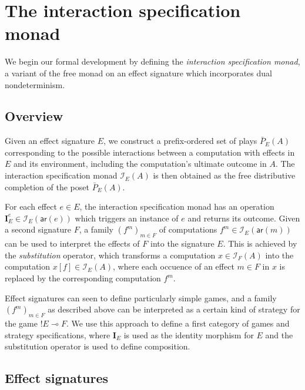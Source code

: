 \documentclass[format=sigplan,authordraft]{acmart}
\newcommand{\kw}[1]{\ensuremath{ \mathsf{#1} }}
\begin{document}



\section{The interaction specification monad} \label{sec:intmonad} %

We begin our formal development
by defining the \emph{interaction specification monad},
a variant of the free monad on an effect signature which
incorporates dual nondeterminism.

\subsection{Overview} %

Given an effect signature $E$,
we construct a prefix-ordered set of plays $\bar{P}_E(A)$
corresponding to the possible interactions between
a computation with effects in $E$
and its environment,
including the computation's ultimate outcome in $A$.
The interaction specification monad $\mathcal{I}_E(A)$ is then obtained
as the free distributive completion of the poset $\bar{P}_E(A)$.

For each effect $e \in E$,
the interaction specification monad
has an operation
$\mathbf{I}_E^e \in \mathcal{I}_E(\kw{ar}(e))$
which triggers an instance of $e$ and returns its outcome.
Given a second signature $F$,
a family $(f^m)_{m \in F}$ of computations
$f^m \in \mathcal{I}_E(\kw{ar}(m))$
can be used to interpret the effects of $F$
into the signature $E$.
This is achieved by the \emph{substitution} operator,
which transforms a computation $x \in \mathcal{I}_F(A)$
into the computation $x[f] \in \mathcal{I}_E(A)$,
where each occuence of an effect $m \in F$ in $x$
is replaced by the corresponding computation $f^m$.

Effect signatures can seen to define
particularly simple games,
and a family $(f^m)_{m \in F}$ as described above
can be interpreted as
a certain kind of strategy for the game ${!E} \multimap F$.
We use this approach to define
a first category of games and strategy specifications,
where $\mathbf{I}_E$ is used as
the identity morphism for $E$ and
the substitution operator is used to define composition.


\subsection{Effect signatures} %
\end{document}
